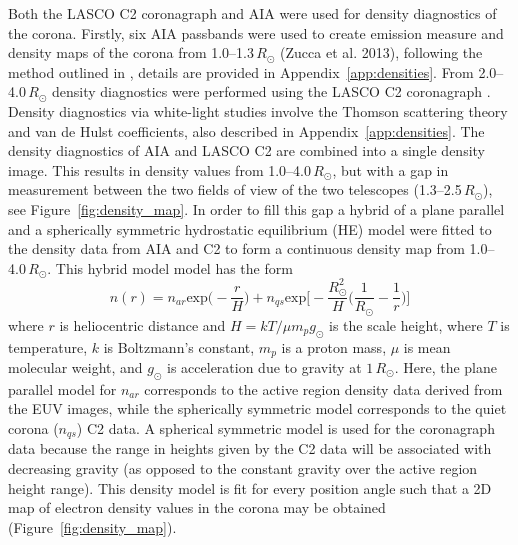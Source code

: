 Both the LASCO C2 coronagraph and AIA were used for density diagnostics of the corona. Firstly, six AIA passbands were used to create emission measure and density maps of the corona from 1.0--1.3\,$R_{\odot}$ (Zucca et al. 2013), following the method outlined in \citet{asch2013}, details are provided in Appendix~\ref{app:densities}. From 2.0--4.0\,$R_{\odot}$ density diagnostics were performed using the LASCO C2 coronagraph \citep{vdeh50}. Density diagnostics via white-light studies involve the Thomson scattering theory and van de Hulst coefficients, also described in Appendix~\ref{app:densities}. The density diagnostics of AIA and LASCO C2 are combined into a single density image. This results in density values from 1.0--4.0\,$R_{\odot}$, but with a gap in measurement between the two fields of view of the two telescopes (1.3--2.5\,$R_{\odot}$), see Figure~\ref{fig:density_map}. In order to fill this gap a hybrid of a plane parallel and a spherically symmetric hydrostatic equilibrium (HE) model were fitted to the density data from AIA and C2 to form a continuous density map from 1.0--4.0\,$R_{\odot}$. This hybrid model model has the form
\begin{equation}
n(r) = n_{ar}\mathrm{exp}\bigg(-\frac{r}{H}\bigg) + n_{qs}\mathrm{exp}\bigg[-\frac{R_{\odot}^2}{H} \bigg(\frac{1}{R_{\odot}}-\frac{1}{r}\bigg)\bigg]
\label{eqn:hybrid_hydro}
\end{equation}
where $r$ is heliocentric distance and $H=kT/\mu m_pg_{\odot}$ is the scale height, where $T$ is temperature, $k$ is Boltzmann's constant, $m_p$ is a proton mass, $\mu$ is mean molecular weight, and $g_{\odot}$ is acceleration due to gravity at $1\,R_{\odot}$. Here, the plane parallel model for $n_{ar}$ corresponds to the active region density data derived from the EUV images, while the spherically symmetric model corresponds to the quiet corona ($n_{qs}$) C2 data. A spherical symmetric model is used for the coronagraph data because the range in heights given by the C2 data will be associated with decreasing gravity (as opposed to the constant gravity over the active region height range). This density model is fit for every position angle such that a 2D map of electron density values in the corona may be obtained (Figure~\ref{fig:density_map}).

